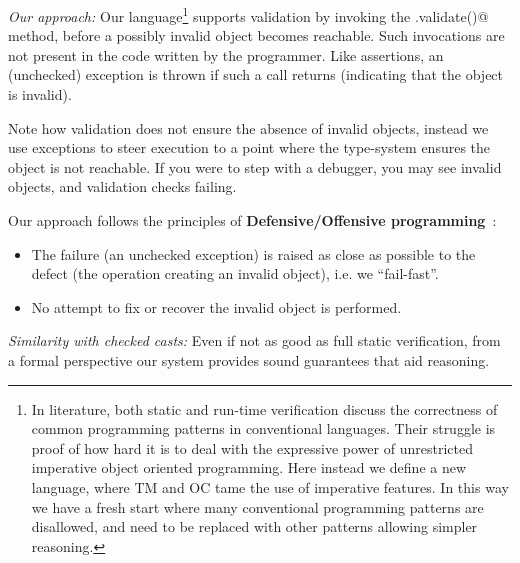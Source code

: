 \loseSpace
\noindent\textit{Our approach:}
Our language\footnote{
In literature, both static and run-time verification discuss
the correctness of common programming patterns in conventional languages.
Their struggle is proof of how hard it is to deal with the expressive power of unrestricted imperative object oriented programming.
 Here instead we define a new language, where TM and OC tame the use of imperative features. In this way
we have a fresh start where
many conventional programming patterns are disallowed,
and need to be replaced with other patterns allowing simpler reasoning.
} supports validation by invoking the \Q@.validate()@ method, before a possibly invalid object becomes reachable. Such invocations are not present in the code written by the programmer. 
Like assertions, an (unchecked) exception is thrown if such a call returns \Q@false@ (indicating that the object is invalid).

Note how validation does not ensure the absence of invalid objects, instead we use exceptions to steer execution to a point where the type-system ensures the object is not reachable.
If you were to step with a debugger, you may see invalid objects, and validation checks failing.

\noindent Our approach follows the principles of \textbf{Defensive/Offensive programming}~\cite{WikiDefensive}:
\begin{itemize}
\item The failure (an unchecked exception)
is raised as close as possible to the defect (the operation creating an invalid object), i.e. we ``fail-fast''.
\item No attempt to fix or recover the invalid object is performed.
\end{itemize}


%
\noindent\textit{Similarity with checked casts:}
Even if not as good as full static verification, from a formal perspective
our system provides sound guarantees that aid reasoning.

